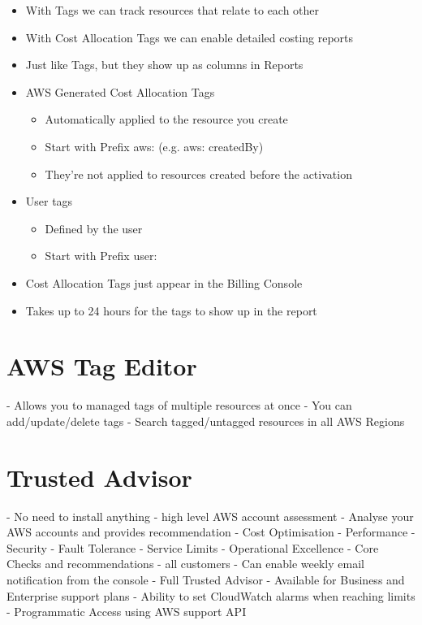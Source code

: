 \documentclass[11pt]{book}
\begin{document}
    \begin{itemize}
        \item With Tags we can track resources that relate to each other
        \item With Cost Allocation Tags we can enable detailed costing reports
        \item Just like Tags, but they show up as columns in Reports
        \item AWS Generated Cost Allocation Tags
        \begin{itemize}
            \item Automatically applied to the resource you create
            \item Start with Prefix aws: (e.g. aws: createdBy)
            \item They're not applied to resources created before the activation
        \end{itemize}
        \item User tags
        \begin{itemize}
            \item Defined by the user
            \item Start with Prefix user:
        \end{itemize}
        \item Cost Allocation Tags just appear in the Billing Console
        \item Takes up to 24 hours for the tags to show up in the report
    \end{itemize}


    \section{AWS Tag Editor}
    - Allows you to managed tags of multiple resources at once
    - You can add/update/delete tags
    - Search tagged/untagged resources in all AWS Regions


    \section{Trusted Advisor}
    - No need to install anything - high level AWS account assessment
    - Analyse your AWS accounts and provides recommendation
    - Cost Optimisation
    - Performance
    - Security
    - Fault Tolerance
    - Service Limits
    - Operational Excellence
    - Core Checks and recommendations - all customers
    - Can enable weekly email notification from the console
    - Full Trusted Advisor - Available for Business and Enterprise support plans
    - Ability to set CloudWatch alarms when reaching limits
    - Programmatic Access using AWS support API
\end{document}
